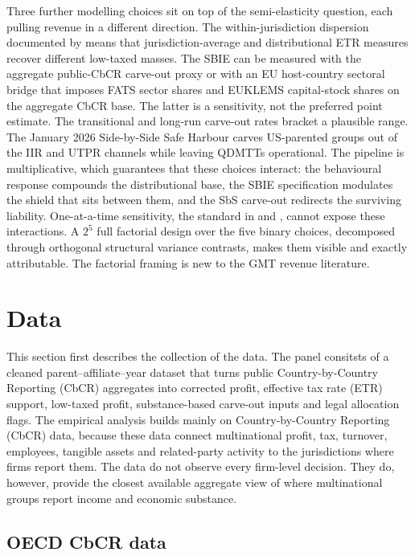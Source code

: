 \documentclass[11pt,a4paper]{article}
\begin{document}
Three further modelling choices sit on top of the semi-elasticity question, each pulling revenue in a different direction. The within-jurisdiction dispersion documented by \citet{hugger2026} means that jurisdiction-average and distributional ETR measures recover different low-taxed masses. The SBIE can be measured with the aggregate public-CbCR carve-out proxy or with an EU host-country sectoral bridge that imposes FATS sector shares and EUKLEMS capital-stock shares on the aggregate CbCR base. The latter is a sensitivity, not the preferred point estimate. The transitional and long-run carve-out rates bracket a plausible range. The January 2026 Side-by-Side Safe Harbour carves US-parented groups out of the IIR and UTPR channels while leaving QDMTTs operational. The pipeline is multiplicative, which guarantees that these choices interact: the behavioural response compounds the distributional base, the SBIE specification modulates the shield that sits between them, and the SbS carve-out redirects the surviving liability. One-at-a-time sensitivity, the standard in \citet{barake2022} and \citet{hugger2026}, cannot expose these interactions. A $2^5$ full factorial design over the five binary choices, decomposed through orthogonal structural variance contrasts, makes them visible and exactly attributable. The factorial framing is new to the GMT revenue literature.

\newpage

\section{Data}\label{data}\label{sec:data}\label{sec:descriptive}

This section first describes the collection of the data. The panel consitsts of a cleaned parent--affiliate--year dataset that turns public Country-by-Country Reporting (CbCR) aggregates into corrected profit, effective tax rate (ETR) support, low-taxed profit, substance-based carve-out inputs and legal allocation flags. The empirical analysis builds mainly on Country-by-Country Reporting (CbCR) data, because these data connect multinational profit, tax, turnover, employees, tangible assets and related-party activity to the jurisdictions where firms report them. The data do not observe every firm-level decision. They do, however, provide the closest available aggregate view of where multinational groups report income and economic substance.

\subsection{OECD CbCR data}\label{CbCR}
\end{document}
